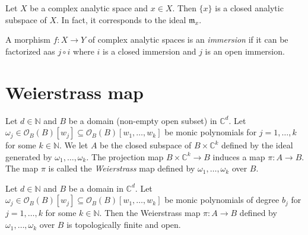 \begin{example}\label{ex-closedpointanalytic}
    Let $X$ be a complex analytic space and $x\in X$. Then $\{x\}$ is a closed analytic subspace of $X$. In fact, it corresponds to the ideal $\mathfrak{m}_x$.
\end{example}

\begin{definition}
    A morphism $f:X\rightarrow Y$ of complex analytic spaces is an \emph{immersion} if it can be factorized aas $j\circ i$ where $i$ is a closed immersion and $j$ is an open immersion. 
\end{definition}



\section{Weierstrass map}

\begin{definition}
    Let $d\in \mathbb{N}$ and $B$ be a domain (non-empty open subset) in $\mathbb{C}^d$. Let $\omega_j \in \mathcal{O}_B(B)[w_j]\subseteq \mathcal{O}_B(B)[w_1,\ldots,w_k]$ be monic polynomials for $j=1,\ldots,k$ for some $k\in \mathbb{N}$. We let $A$ be the closed subspace of $B\times \mathbb{C}^k$ defined by the ideal generated by $\omega_1,\ldots,\omega_k$. The projection map $B\times \mathbb{C}^k\rightarrow B$ induces a map $\pi:A\rightarrow B$. The map $\pi$ is called the \emph{Weierstrass} map defined by $\omega_1,\ldots,\omega_k$ over $B$.
\end{definition}


\begin{thm}\label{thm-Weiemapfiniteandopen}
    Let $d\in \mathbb{N}$ and $B$ be a domain in $\mathbb{C}^d$. Let $\omega_j \in \mathcal{O}_B(B)[w_j]\subseteq \mathcal{O}_B(B)[w_1,\ldots,w_k]$ be monic polynomials of degree $b_j$ for $j=1,\ldots,k$ for some $k\in \mathbb{N}$. Then the Weierstrass map $\pi:A\rightarrow B$ defined by $\omega_1,\ldots,\omega_k$ over $B$ is topologically finite and open.
\end{thm}



